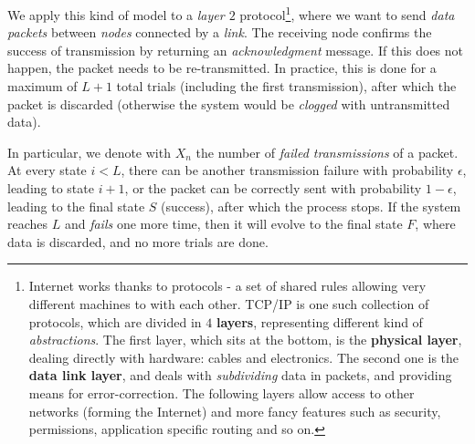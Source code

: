 \documentclass[../template.tex]{subfiles}
\begin{document}
We apply this kind of model to a \textit{layer $2$} protocol\footnote{Internet works thanks to protocols - a set of shared rules allowing very different machines to  with each other. TCP/IP is one such collection of protocols, which are divided in $4$ \textbf{layers}, representing different kind of \textit{abstractions}. The first layer, which sits at the bottom, is the \textbf{physical layer}, dealing directly with hardware: cables and electronics. The second one is the \textbf{data link layer}, and deals with \textit{subdividing} data in packets, and providing means for error-correction. The following layers allow access to other networks (forming the Internet) and more fancy features such as security, permissions, application specific routing and so on.}, where we want to send \textit{data packets} between \textit{nodes} connected by a \textit{link}. The receiving node confirms the success of transmission by returning an \textit{acknowledgment} message. If this does not happen, the packet needs to be re-transmitted. In practice, this is done for a maximum of $L+1$ total trials (including the first transmission), after which the packet is discarded (otherwise the system would be \textit{clogged} with untransmitted data). 

\medskip

In particular, we denote with $X_n$ the number of \textit{failed transmissions} of a packet. At every state $i < L$, there can be another transmission failure with probability $\epsilon$, leading to state $i+1$, or the packet can be correctly sent with probability $1-\epsilon$, leading to the final state $S$ (success), after which the process stops. If the system reaches $L$ and \textit{fails} one more time, then it will evolve to the final state $F$, where data is discarded, and no more trials are done.   

\medskip
\end{document}

